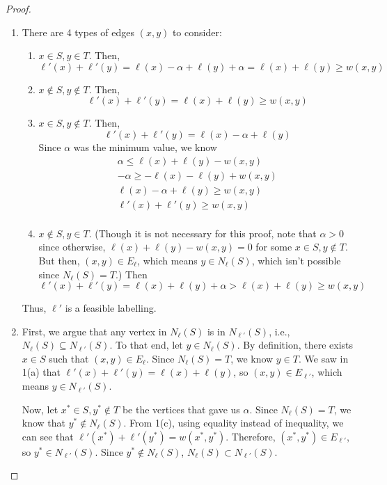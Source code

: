 \documentclass[12pt]{article}
\newcommand{\lskip}{\vspace{\baselineskip}}
\begin{document}
\begin{proof}  $ $\newline
  \begin{enumerate}
    \item There are 4 types of edges $(x,y)$ to consider:
    \begin{enumerate}
      \item $x \in S, y \in T$.
      Then,
      \[ \ell'(x) + \ell'(y) = \ell(x) - \alpha + \ell(y) + \alpha = \ell(x) + \ell(y) \geq w(x,y) \]
      \item $x \notin S, y \notin T$.
      Then,
      \[ \ell'(x) + \ell'(y) = \ell(x) + \ell(y) \geq w(x,y) \]
      \item $x \in S, y \notin T$.
      Then,
      \[ \ell'(x) + \ell'(y) = \ell(x) - \alpha + \ell(y) \]
      Since $\alpha$ was the minimum value, we know
      \begin{align*}
        \alpha \leq \ell(x) + \ell(y) - w(x,y) \\
        -\alpha \geq -\ell(x) - \ell(y) + w(x,y) \\
        \ell(x) - \alpha + \ell(y) \geq w(x,y) \\
        \ell'(x) + \ell'(y) \geq w(x,y) \\
      \end{align*}
      \item $x \notin S, y \in T$. (Though it is not necessary for this proof, note that $\alpha > 0$ since otherwise, $\ell(x) + \ell(y) - w(x,y) = 0$ for some $x \in S, y \notin T$. But then, $(x,y) \in E_\ell$, which means $y \in N_\ell(S)$, which isn't possible since $N_\ell(S) = T$.) Then
      \[ \ell'(x) + \ell'(y) = \ell(x) + \ell(y) + \alpha > \ell(x) + \ell(y) \geq w(x,y) \]
    \end{enumerate}
    Thus, $\ell'$ is a feasible labelling.

    \item First, we argue that any vertex in $N_\ell(S)$ is in $N_{\ell'}(S)$, i.e., $N_\ell(S) \subseteq N_{\ell'}(S)$. To that end, let $y \in N_\ell(S)$. By definition, there exists $x \in S$ such that $(x,y) \in E_\ell$. Since $N_\ell(S) = T$, we know $y \in T$. We saw in 1(a) that $\ell'(x) + \ell'(y) = \ell(x) + \ell(y)$, so $(x,y) \in E_{\ell'}$, which means $y \in N_{\ell'}(S)$.

    Now, let $x^* \in S, y^* \notin T$ be the vertices that gave us $\alpha$. Since $N_\ell(S) = T$, we know that $y^* \notin N_\ell(S)$. From 1(c), using equality instead of inequality, we can see that $\ell'(x^*) + \ell'(y^*) = w(x^*,y^*)$. Therefore, $(x^*,y^*) \in E_{\ell'}$, so $y^* \in N_{\ell'}(S)$. Since $y^* \notin N_{\ell}(S)$, $N_{\ell}(S) \subset N_{\ell'}(S)$.
  \end{enumerate}
\end{proof}
\lskip
\end{document}
